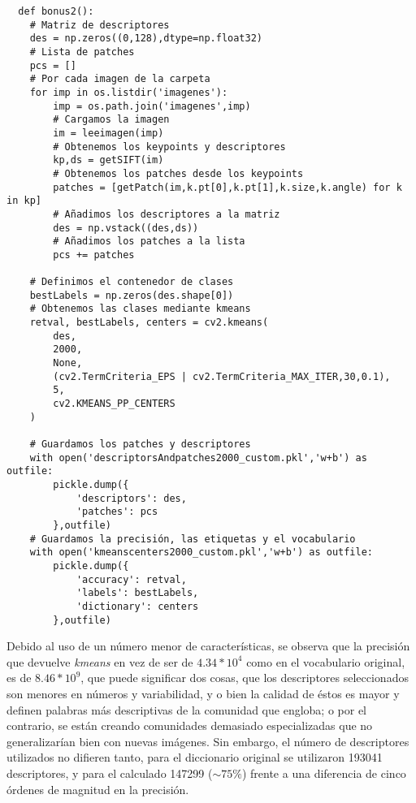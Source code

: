 \documentclass{article}
\begin{document}
\begin{verbatim}
  def bonus2():
    # Matriz de descriptores
    des = np.zeros((0,128),dtype=np.float32)
    # Lista de patches
    pcs = []
    # Por cada imagen de la carpeta
    for imp in os.listdir('imagenes'):
        imp = os.path.join('imagenes',imp)
        # Cargamos la imagen
        im = leeimagen(imp)
        # Obtenemos los keypoints y descriptores
        kp,ds = getSIFT(im)
        # Obtenemos los patches desde los keypoints
        patches = [getPatch(im,k.pt[0],k.pt[1],k.size,k.angle) for k in kp]
        # Añadimos los descriptores a la matriz
        des = np.vstack((des,ds))
        # Añadimos los patches a la lista
        pcs += patches
    
    # Definimos el contenedor de clases
    bestLabels = np.zeros(des.shape[0])
    # Obtenemos las clases mediante kmeans
    retval, bestLabels, centers = cv2.kmeans(
        des,
        2000,
        None,
        (cv2.TermCriteria_EPS | cv2.TermCriteria_MAX_ITER,30,0.1),
        5,
        cv2.KMEANS_PP_CENTERS
    )
    
    # Guardamos los patches y descriptores
    with open('descriptorsAndpatches2000_custom.pkl','w+b') as outfile:
        pickle.dump({
            'descriptors': des,
            'patches': pcs
        },outfile)
    # Guardamos la precisión, las etiquetas y el vocabulario
    with open('kmeanscenters2000_custom.pkl','w+b') as outfile:
        pickle.dump({
            'accuracy': retval,
            'labels': bestLabels,
            'dictionary': centers
        },outfile)
\end{verbatim}

Debido al uso de un número menor de características, se observa que la precisión que devuelve \textit{kmeans} en vez de ser de $4.34*10^4$ como en el vocabulario original, es de $8.46*10^9$, que puede significar dos cosas, que los descriptores seleccionados son menores en números y variabilidad, y o bien la calidad de éstos es mayor y definen palabras más descriptivas de la comunidad que engloba; o por el contrario, se están creando comunidades demasiado especializadas que no generalizarían bien con nuevas imágenes. Sin embargo, el número de descriptores utilizados no difieren tanto, para el diccionario original se utilizaron 193041 descriptores, y para el calculado 147299 ($\sim75\%$) frente a una diferencia de cinco órdenes de magnitud en la precisión.
\end{document}
